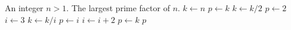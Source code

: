 
\begin{algorithmic}[1]
\Require An integer $n > 1$.
\Ensure The largest prime factor of $n$.
\State $k \gets n$
\State $p \gets k$
  \State $k \gets k / 2$
  \State $p \gets 2$
\EndWhile
\State $i \gets 3$
    \State $k \gets k / i$
    \State $p \gets i$
  \EndWhile
  \State $i \gets i + 2$
\EndWhile
{}
  \State $p \gets k$
\EndIf
\State \Return $p$
\end{algorithmic}

